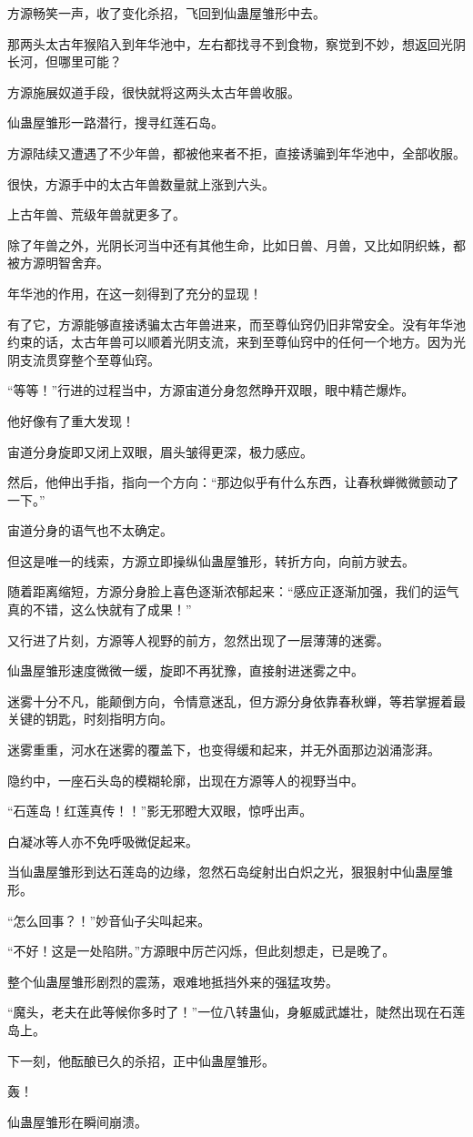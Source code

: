 \begin{this_body}
方源畅笑一声，收了变化杀招，飞回到仙蛊屋雏形中去。

那两头太古年猴陷入到年华池中，左右都找寻不到食物，察觉到不妙，想返回光阴长河，但哪里可能？

方源施展奴道手段，很快就将这两头太古年兽收服。

仙蛊屋雏形一路潜行，搜寻红莲石岛。

方源陆续又遭遇了不少年兽，都被他来者不拒，直接诱骗到年华池中，全部收服。

很快，方源手中的太古年兽数量就上涨到六头。

上古年兽、荒级年兽就更多了。

除了年兽之外，光阴长河当中还有其他生命，比如日兽、月兽，又比如阴织蛛，都被方源明智舍弃。

年华池的作用，在这一刻得到了充分的显现！

有了它，方源能够直接诱骗太古年兽进来，而至尊仙窍仍旧非常安全。没有年华池约束的话，太古年兽可以顺着光阴支流，来到至尊仙窍中的任何一个地方。因为光阴支流贯穿整个至尊仙窍。

“等等！”行进的过程当中，方源宙道分身忽然睁开双眼，眼中精芒爆炸。

他好像有了重大发现！

宙道分身旋即又闭上双眼，眉头皱得更深，极力感应。

然后，他伸出手指，指向一个方向：“那边似乎有什么东西，让春秋蝉微微颤动了一下。”

宙道分身的语气也不太确定。

但这是唯一的线索，方源立即操纵仙蛊屋雏形，转折方向，向前方驶去。

随着距离缩短，方源分身脸上喜色逐渐浓郁起来：“感应正逐渐加强，我们的运气真的不错，这么快就有了成果！”

又行进了片刻，方源等人视野的前方，忽然出现了一层薄薄的迷雾。

仙蛊屋雏形速度微微一缓，旋即不再犹豫，直接射进迷雾之中。

迷雾十分不凡，能颠倒方向，令情意迷乱，但方源分身依靠春秋蝉，等若掌握着最关键的钥匙，时刻指明方向。

迷雾重重，河水在迷雾的覆盖下，也变得缓和起来，并无外面那边汹涌澎湃。

隐约中，一座石头岛的模糊轮廓，出现在方源等人的视野当中。

“石莲岛！红莲真传！！”影无邪瞪大双眼，惊呼出声。

白凝冰等人亦不免呼吸微促起来。

当仙蛊屋雏形到达石莲岛的边缘，忽然石岛绽射出白炽之光，狠狠射中仙蛊屋雏形。

“怎么回事？！”妙音仙子尖叫起来。

“不好！这是一处陷阱。”方源眼中厉芒闪烁，但此刻想走，已是晚了。

整个仙蛊屋雏形剧烈的震荡，艰难地抵挡外来的强猛攻势。

“魔头，老夫在此等候你多时了！”一位八转蛊仙，身躯威武雄壮，陡然出现在石莲岛上。

下一刻，他酝酿已久的杀招，正中仙蛊屋雏形。

轰！

仙蛊屋雏形在瞬间崩溃。

\end{this_body}

